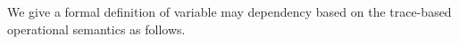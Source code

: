 \documentclass[a4paper,11pt]{article}
\begin{document}
   We give a formal definition of variable may dependency based on the trace-based operational semantics as follows.
%
% 
%
\end{document}
